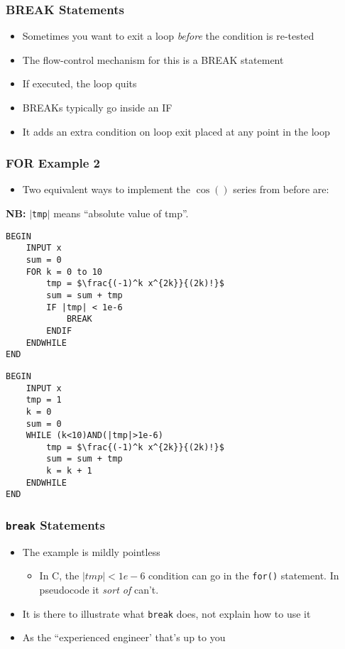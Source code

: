 \documentclass[14pt]{beamer}
\begin{document}
\begin{frame}
\frametitle{BREAK Statements}
\begin{itemize}
\item Sometimes you want to exit a loop \textit{before} the condition is re-tested
\item The flow-control mechanism for this is a BREAK statement
\item If executed, the loop quits
\item BREAKs typically go inside an IF
\item It adds an extra condition on loop exit placed at any point in the loop
\end{itemize}
\end{frame}

\begin{frame}[fragile]
\frametitle{FOR Example 2}
\begin{itemize}
\item Two equivalent ways to implement the $\cos()$ series from before are:
\end{itemize}
{\small\textbf{NB:} $|$\texttt{tmp}$|$ means ``absolute value of tmp''.}
\begin{multicols}{2}
\begin{lstlisting}[style=pseudo,mathescape=true,basicstyle=\ttfamily\scriptsize]
BEGIN
	INPUT x
	sum = 0
	FOR k = 0 to 10
		tmp = $\frac{(-1)^k x^{2k}}{(2k)!}$
		sum = sum + tmp
		IF |tmp| < 1e-6
			BREAK
		ENDIF
	ENDWHILE 
END
\end{lstlisting}
\columnbreak
\begin{lstlisting}[style=pseudo,mathescape=true,basicstyle=\ttfamily\scriptsize]
BEGIN
	INPUT x
	tmp = 1
	k = 0
	sum = 0
	WHILE (k<10)AND(|tmp|>1e-6)
		tmp = $\frac{(-1)^k x^{2k}}{(2k)!}$
		sum = sum + tmp
		k = k + 1
	ENDWHILE 
END
\end{lstlisting}

\end{multicols}
\end{frame}

\begin{frame}
\frametitle{\texttt{break} Statements}
\begin{itemize}
\item The example is mildly pointless
	\begin{itemize}
		\item In C, the $\left| tmp \right| < 1e-6$ condition can go in the \texttt{for()} statement. In pseudocode it \textit{sort of} can't.
	\end{itemize}
\item It is there to illustrate what \texttt{break} does, not explain how to use it
\item As the ``experienced engineer' that's up to you
\end{itemize}
\end{frame}
\end{document}
